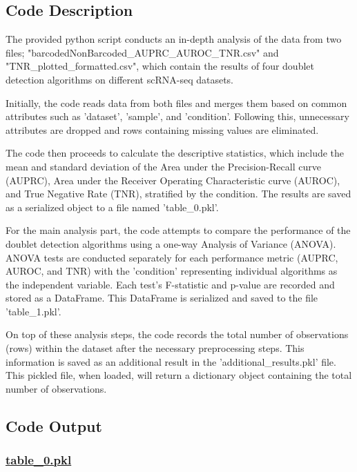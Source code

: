 \documentclass[11pt]{article}
\begin{document}
\subsection{Code Description}

The provided python script conducts an in-depth analysis of the data from two files; "barcodedNonBarcoded\_AUPRC\_AUROC\_TNR.csv" and "TNR\_plotted\_formatted.csv", which contain the results of four doublet detection algorithms on different scRNA-seq datasets.

Initially, the code reads data from both files and merges them based on common attributes such as 'dataset', 'sample', and 'condition'. Following this, unnecessary attributes are dropped and rows containing missing values are eliminated.

The code then proceeds to calculate the descriptive statistics, which include the mean and standard deviation of the Area under the Precision-Recall curve (AUPRC), Area under the Receiver Operating Characteristic curve (AUROC), and True Negative Rate (TNR), stratified by the condition. The results are saved as a serialized object to a file named 'table\_0.pkl'.

For the main analysis part, the code attempts to compare the performance of the doublet detection algorithms using a one-way Analysis of Variance (ANOVA). ANOVA tests are conducted separately for each performance metric (AUPRC, AUROC, and TNR) with the 'condition' representing individual algorithms as the independent variable. Each test's F-statistic and p-value are recorded and stored as a DataFrame. This DataFrame is serialized and saved to the file 'table\_1.pkl'.

On top of these analysis steps, the code records the total number of observations (rows) within the dataset after the necessary preprocessing steps. This information is saved as an additional result in the 'additional\_results.pkl' file. This pickled file, when loaded, will return a dictionary object containing the total number of observations.

\subsection{Code Output}\hypertarget{file-table-0-pkl}{}

\subsubsection*{\hyperlink{code-Data Analysis-table-0-pkl}{table\_0.pkl}}
\end{document}
